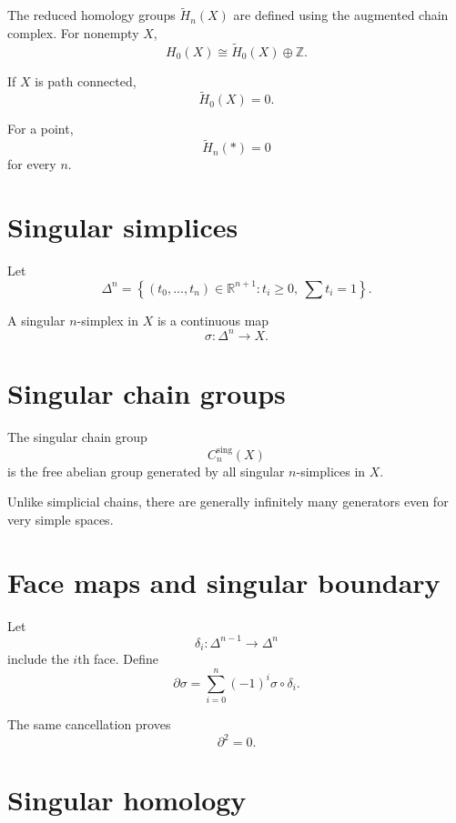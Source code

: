 \begin{definition}
\label{def:viii17-reduced}
The reduced homology groups \(\widetilde H_n(X)\) are defined using the
augmented chain complex.  For nonempty \(X\),
\[
H_0(X)\cong \widetilde H_0(X)\oplus\mathbb Z.
\]
\end{definition}

If \(X\) is path connected,
\[
\widetilde H_0(X)=0.
\]

For a point,
\[
\widetilde H_n(*)=0
\]
for every \(n\).

\section{Singular simplices}

Let
\[
\Delta^n
=
\left\{
(t_0,\dots,t_n)\in\mathbb R^{n+1}:
t_i\ge0,\ \sum t_i=1
\right\}.
\]

\begin{definition}
\label{def:viii17-singular-simplex}
A singular \(n\)-simplex in \(X\) is a continuous map
\[
\sigma:\Delta^n\to X.
\]
\end{definition}

\section{Singular chain groups}

\begin{definition}
\label{def:viii17-singular-chain}
The singular chain group
\[
C_n^{\mathrm{sing}}(X)
\]
is the free abelian group generated by all singular \(n\)-simplices in \(X\).
\end{definition}

Unlike simplicial chains, there are generally infinitely many generators even
for very simple spaces.

\section{Face maps and singular boundary}

Let
\[
\delta_i:\Delta^{n-1}\to\Delta^n
\]
include the \(i\)th face.  Define
\[
\partial\sigma
=
\sum_{i=0}^n(-1)^i\sigma\circ\delta_i.
\]

The same cancellation proves
\[
\partial^2=0.
\]

\section{Singular homology}

